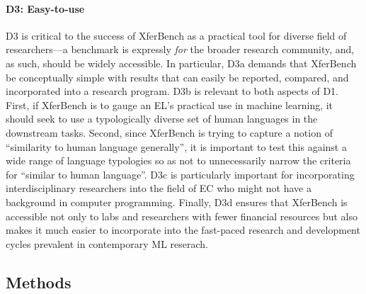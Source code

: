 \paragraph{D3: Easy-to-use}
D3 is critical to the success of XferBench as a practical tool for diverse field of researchers---a benchmark is expressly \emph{for} the broader research community, and, as such, should be widely accessible.
In particular, D3a demands that XferBench be conceptually simple with results that can easily be reported, compared, and incorporated into a research program.
D3b is relevant to both aspects of D1.
First, if XferBench is to gauge an EL's practical use in machine learning, it should seek to use a typologically diverse set of human languages in the downstream tasks.
  Second, since XferBench is trying to capture a notion of ``similarity to human language generally'', it is important to test this against a wide range of language typologies so as not to unnecessarily narrow the criteria for ``similar to human language''.
D3c is particularly important for incorporating interdisciplinary researchers into the field of EC who might not have a background in computer programming.
Finally, D3d ensures that XferBench is accessible not only to labs and researchers with fewer financial resources
  but also makes it much easier to incorporate into the fast-paced research and development cycles prevalent in contemporary ML reserach.


\subsection{Methods}
\unskip\label{sec:methods}


